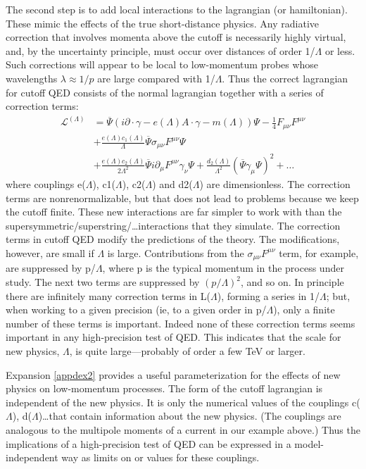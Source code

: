 \documentclass[cs4size,titlepage,twoside]{ctexart}
\begin{document}
\begin{appendices}
The second step is to add local interactions to the lagrangian (or hamiltonian).
These mimic the effects of the true short-distance physics. Any radiative
correction that involves momenta above the cutoff is necessarily highly
virtual, and, by the uncertainty principle, must occur over distances of order
1/$\Lambda$ or less. Such corrections will appear to be local to low-momentum probes
whose wavelengths $\lambda\approx1/p$ are large compared with 1/$\Lambda$. Thus the correct
lagrangian for cutoff QED consists of the normal lagrangian together with a
series of correction terms:
\begin{align}\label{appdex2}
 \nonumber \mathcal{L}^{(\Lambda)}  &=\overline{\Psi}(i\partial\cdot\gamma-e(\Lambda)A\cdot\gamma-m(\Lambda))\Psi-\frac{1}{4}F_{\mu\nu}F^{\mu\nu}\\ \nonumber & + \frac{e(\Lambda)c_1(\Lambda)}{\Lambda}\overline{\Psi}\sigma_{\mu\nu}F^{\mu\nu}\Psi \\
  & + \frac{e(\Lambda)c_2(\Lambda)}{2\Lambda^2}\overline{\Psi}i\partial_{\mu}F^{\mu\nu}\gamma_{\nu}\Psi+\frac{d_2(\Lambda)}{\Lambda^2}(\overline{\Psi}\gamma_{\mu}\Psi)^2+\dots
\end{align}
where couplings e($\Lambda$), c1($\Lambda$), c2($\Lambda$) and d2($\Lambda$) are dimensionless. The correction
terms are nonrenormalizable, but that does not lead to problems because we
keep the cutoff finite. These new interactions are far simpler to work with than
the supersymmetric/superstring/\dots interactions that they simulate.
The correction terms in cutoff QED modify the predictions of the theory.
The modifications, however, are small if $\Lambda$ is large. Contributions from the
$\sigma_{\mu\nu}F^{\mu\nu}$ term, for example, are suppressed by p/$\Lambda$, where p is the typical
momentum in the process under study. The next two terms are suppressed
by $(p/\Lambda)^2$, and so on. In principle there are infinitely many correction terms in L($\Lambda$), forming a series in 1/$\Lambda$; but, when working to a given precision (ie, to
a given order in p/$\Lambda$), only a finite number of these terms is important. Indeed
none of these correction terms seems important in any high-precision test of
QED. This indicates that the scale for new physics, $\Lambda$, is quite large—probably
of order a few TeV or larger.

Expansion \eqref{appdex2} provides a useful parameterization for the effects of new
physics on low-momentum processes. The form of the cutoff lagrangian is
independent of the new physics. It is only the numerical values of the couplings
c($\Lambda$), d($\Lambda$)\dots that contain information about the new physics. (The couplings
are analogous to the multipole moments of a current in our example above.)
Thus the implications of a high-precision test of QED can be expressed in a
model-independent way as limits on or values for these couplings.


\end{appendices}
\end{document}
